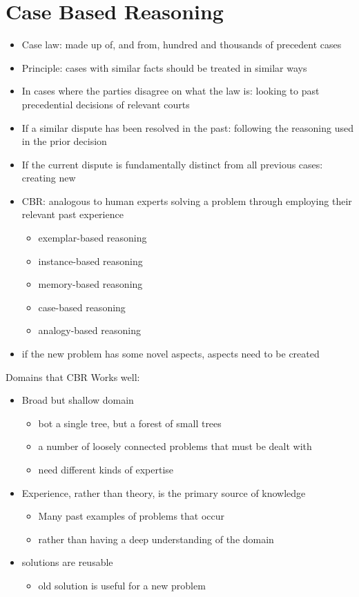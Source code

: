 \section{Case Based Reasoning}

\begin{itemize}
\item Case law: made up of, and from, hundred and thousands of precedent cases
\item Principle: cases with similar facts should be treated in similar ways 
\item In cases where the parties disagree on what the law is: looking to past precedential decisions of relevant courts
\item If a similar dispute has been resolved in the past: following the reasoning used in the prior decision
\item If the current dispute is fundamentally distinct from all previous cases: creating new 
\item CBR: analogous to human experts solving a problem through employing their relevant past experience
\begin{itemize}
\item exemplar-based reasoning
\item instance-based reasoning
\item memory-based reasoning
\item case-based reasoning
\item analogy-based reasoning
\end{itemize}
\item if the new problem has some novel aspects, aspects need to be created
\end{itemize}

Domains that CBR Works well:
\begin{itemize}
\item Broad but shallow domain
\begin{itemize}
\item bot a single tree, but a forest of small trees
\item a number of loosely connected problems that must be dealt with
\item need different kinds of expertise
\end{itemize}
\item Experience, rather than theory, is the primary source of knowledge
\begin{itemize}
\item Many past examples of problems that occur
\item rather than having a deep understanding of the domain
\end{itemize}
\item solutions are reusable
\begin{itemize}
\item old solution is useful for a new problem
\end{itemize}
\end{itemize}

